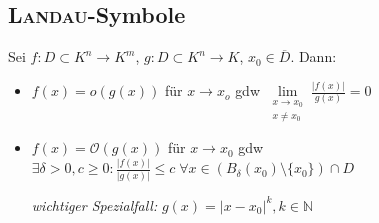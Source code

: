 \subsection{\textsc{Landau}-Symbole}
Sei $f:D\subset K^n \to K^m$, $g:D\subset K^n \to K$, $x_0 \in \overline{D}$. Dann:
\begin{itemize}
	\item $f(x) = o(g(x))$ für $x\to x_o$ \gls{gdw} $\lim\limits_{\substack{x\to x_0 \\ x\neq x_0}} \frac{\vert f(x) \vert}{g(x)} = 0$
	\item $f(x) = \mathcal{O}(g(x))$ für $x\to x_0$ \gls{gdw} $\exists \delta > 0, c \ge 0: \frac{\vert f(x) \vert}{\vert g(x) \vert} \le c \;\forall x\in \left( B_\delta(x_0)\setminus \{ x_0\}\right) \cap D$
	
	\emph{wichtiger Spezialfall:} $g(x) = \vert x - x_0\vert ^k, k\in\mathbb{N}$
\end{itemize}

